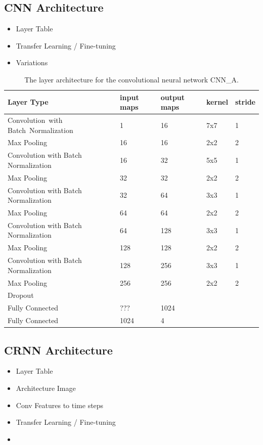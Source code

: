 \subsection{CNN Architecture}
\label{sec:cnn_architecture}


    \begin{itemize}
        \item Layer Table
        \item Transfer Learning / Fine-tuning
        \item Variations
    \end{itemize}
    
    \begin{table}[h]
  \centering
  \begin{tabularx}{\textwidth}{Xllll}
  \toprule
  Layer Type                       & input maps  & output maps & kernel & stride  \\ \midrule
  \mbox{Convolution with} \mbox{Batch Normalization}  & 1           & 16     & 7x7    & 1       \\ 
  Max Pooling                           & 16          & 16     & 2x2    & 2       \\ 
  Convolution with Batch Normalization  & 16          & 32     & 5x5    & 1       \\ 
  Max Pooling                           & 32          & 32     & 2x2    & 2       \\ 
  Convolution with Batch Normalization  & 32          & 64     & 3x3    & 1       \\ 
  Max Pooling                           & 64          & 64     & 2x2    & 2       \\ 
  Convolution with Batch Normalization  & 64          & 128    & 3x3    & 1       \\ 
  Max Pooling                           & 128         & 128    & 2x2    & 2       \\ 
  Convolution with Batch Normalization  & 128         & 256    & 3x3    & 1       \\ 
  Max Pooling                           & 256         & 256    & 2x2    & 2       \\ 
  Dropout                               &             &        &        &         \\ 
  Fully Connected                       & ???         & 1024   &        &         \\ 
  Fully Connected                       & 1024        & 4      &        &        \\ 
  \bottomrule
  \end{tabularx}
  \caption{The layer architecture for the convolutional neural network CNN\_A.}
  \label{tab:layers_CNN_A}
  \end{table}
    
    

\subsection{CRNN Architecture}

    \begin{itemize}
        \item Layer Table
        \item Architecture Image
        \item Conv Features to time steps
        \item Transfer Learning / Fine-tuning
        \item 
    \end{itemize}
